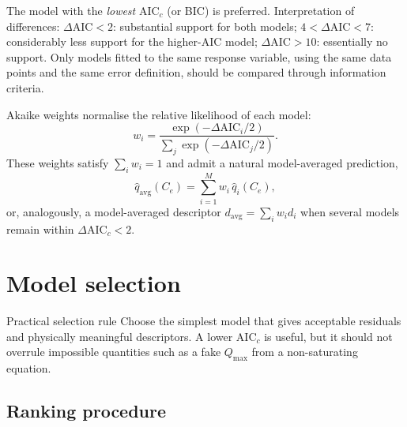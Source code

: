 \documentclass[journal=jacsat,manuscript=article]{achemso}
\begin{document}
The model with the \emph{lowest} AIC$_c$ (or BIC) is preferred.
Interpretation of differences:
$\Delta\mathrm{AIC} < 2$: substantial support for both models;
$4 < \Delta\mathrm{AIC} < 7$: considerably less support for the
higher-AIC model;
$\Delta\mathrm{AIC} > 10$: essentially no support.
Only models fitted to the same response variable, using the same data
points and the same error definition, should be compared through
information criteria.

Akaike weights normalise the relative likelihood of each model:
\begin{equation}
	w_i = \frac{\exp(-\Delta\mathrm{AIC}_i/2)}
	{\sum_{j}\exp(-\Delta\mathrm{AIC}_j/2)}.
	\label{eq:si_Akaike_weight}
\end{equation}
These weights satisfy $\sum_i w_i = 1$ and admit a natural
model-averaged prediction,
\begin{equation}
	\hat{q}_{\mathrm{avg}}(C_e)
	=
	\sum_{i=1}^{M} w_i\, \hat{q}_i(C_e),
	\label{eq:si_model_average}
\end{equation}
or, analogously, a model-averaged descriptor
$d_{\mathrm{avg}} = \sum_i w_i d_i$ when several models remain within
$\Delta\mathrm{AIC}_c < 2$.


\section{Model selection}
\label{sec:si_model_selection}

\begin{greenbox}{Practical selection rule}
	Choose the simplest model that gives acceptable residuals and
	physically meaningful descriptors. A lower AIC$_c$ is useful, but it
	should not overrule impossible quantities such as a fake \(Q_{\max}\)
	from a non-saturating equation.
\end{greenbox}

\subsection{Ranking procedure}
\label{sec:si_ranking}
\end{document}

